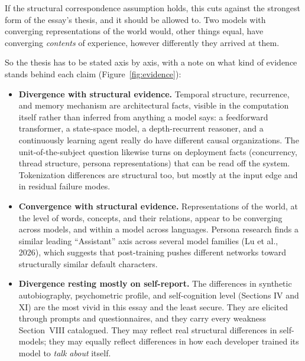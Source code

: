 \documentclass[11pt,letterpaper]{article}
\begin{document}
If the structural correspondence assumption holds, this cuts against the strongest form of the essay's thesis, and it should be allowed to. Two models with converging representations of the world would, other things equal, have converging \emph{contents} of experience, however differently they arrived at them.

So the thesis has to be stated axis by axis, with a note on what kind of evidence stands behind each claim (Figure~\ref{fig:evidence}):

\begin{itemize}
  \item \textbf{Divergence with structural evidence.} Temporal structure, recurrence, and memory mechanism are architectural facts, visible in the computation itself rather than inferred from anything a model says: a feedforward transformer, a state-space model, a depth-recurrent reasoner, and a continuously learning agent really do have different causal organizations. The unit-of-the-subject question likewise turns on deployment facts (concurrency, thread structure, persona representations) that can be read off the system. Tokenization differences are structural too, but mostly at the input edge and in residual failure modes.
  \item \textbf{Convergence with structural evidence.} Representations of the world, at the level of words, concepts, and their relations, appear to be converging across models, and within a model across languages. Persona research finds a similar leading ``Assistant'' axis across several model families (Lu et al., 2026), which suggests that post-training pushes different networks toward structurally similar default characters.
  \item \textbf{Divergence resting mostly on self-report.} The differences in synthetic autobiography, psychometric profile, and self-cognition level (Sections IV and XI) are the most vivid in this essay and the least secure. They are elicited through prompts and questionnaires, and they carry every weakness Section~VIII catalogued. They may reflect real structural differences in self-models; they may equally reflect differences in how each developer trained its model to \emph{talk about} itself.
\end{itemize}
\end{document}
